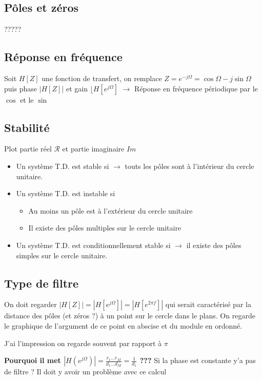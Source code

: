 \documentclass{article}
\theoremstyle{plain}%
\theoremstyle{definition}
\theoremstyle{remark}
\begin{document}
\subsection{Pôles et zéros}
?????

\subsection{Réponse en fréquence}
Soit $ H[Z] $ une fonction de transfert, on remplace $ Z = e^{-j \Omega } = \cos \Omega - j \sin \Omega $ puis phase $ \left| H[Z] \right|  $ et gain $ \lfloor H[e^{j \Omega }] $ 
$\rightarrow$ Réponse en fréquence périodique par le $ \cos  $ et le $ \sin  $ 


\subsection{Stabilité}
Plot partie réel $ \mathcal{R} $ et partie imaginaire $ Im $ 
\begin{itemize}
    \item Un système T.D. est stable si $\rightarrow$ touts les pôles sont à l'intérieur du cercle unitaire.
    \item Un système T.D. est instable si \begin{itemize}
        \item Au moins un pôle est à l'extérieur du cercle unitaire
        \item Il existe des pôles multiples sur le cercle unitaire
    \end{itemize}
    \item Un système T.D. est conditionnellement stable si $\rightarrow$ il existe des pôles simples sur le cercle unitaire.
\end{itemize}

\subsection{Type de filtre}
On doit regarder $ \left| H[Z] \right| = \left| H[e^{j \Omega }] \right| = \left| H[e^{2 \pi f}] \right| $ qui serait caractérisé par la distance des pôles (et zéros ?) à un point sur le cercle dans le plans. On regarde le graphique de l'argument de ce point en abscise et du module en ordonné.

J'ai l'impression on regarde souvent par rapport à $ \pi  $ 

\textbf{Pourquoi il met $ \left| H(e^{j \Omega }) \right|  = \frac{r_1\dots r_M}{d_1\dots d_M} = \frac{1}{d_1}$ ??? } Si la phase est constante y'a pas de filtre ? Il doit y avoir un problème avec ce calcul
\end{document}
